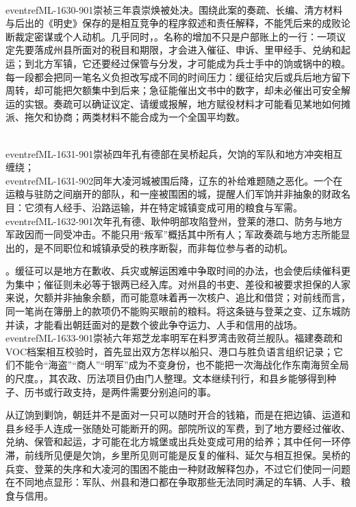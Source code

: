 \\eventref{ML-1630-901}{崇祯三年袁崇焕被处决}。围绕此案的奏疏、长编、清方材料与后出的《明史》保存的是相互竞争的程序叙述和责任解释，不能凭后来的成败论断裁定密谋或个人动机。几乎同时，。名称的增加不只是户部账上的一行：一项议定先要落成州县所面对的税目和期限，才会进入催征、申诉、里甲经手、兑纳和起运；到北方军镇，它还要经过保管与分发，才可能成为兵士手中的饷或锅中的粮。每一段都会把同一笔名义负担改写成不同的时间压力：缓征给灾后或兵后地方留下周转，却可能把欠额集中到后来；急征能催出文书中的数字，却未必催出可安全解运的实银。奏疏可以确证议定、请缓或报解，地方赋役材料才可能看见某地如何摊派、拖欠和协商；两类材料不能合成为一个全国平均数。

\\eventref{ML-1631-901}{崇祯四年孔有德部在吴桥起兵}，欠饷的军队和地方冲突相互缠绕；\\eventref{ML-1631-902}{同年大凌河城被围后降}，辽东的补给难题随之恶化。一个在运粮与驻防之间崩开的部队，和一座被围困的城，提醒人们军饷并非抽象的财政名目：它须有人经手、沿路运输，并在特定城镇变成可用的粮食与军需。\\eventref{ML-1632-901}{次年孔有德、耿仲明部攻陷登州}，登莱的港口、防务与地方军政因而一同受冲击。不能只用“叛军”概括其中所有人；军政奏疏与地方志所能显出的，是不同职位和城镇承受的秩序断裂，而非每位参与者的动机。

。缓征可以是地方在歉收、兵灾或解运困难中争取时间的办法，也会使后续催科更为集中；催征则未必等于银两已经入库。对州县的书吏、差役和被要求担保的人家来说，欠额并非抽象余额，而可能意味着再一次核户、追比和借贷；对前线而言，同一笔尚在簿册上的款项仍不能购买眼前的粮料。将这条链与登莱之变、辽东城防并读，才能看出朝廷面对的是数个彼此争夺运力、人手和信用的战场。\\eventref{ML-1633-901}{崇祯六年郑芝龙率明军在料罗湾击败荷兰舰队}。福建奏疏和VOC档案相互校验时，首先显出双方怎样以船只、港口与胜负语言组织记录；它们不能令“海盗”“商人”“明军”成为不变身份，也不能把一次海战化作东南海贸全局的尺度。，其农政、历法项目仍由门人整理。文本继续刊行，和县乡能够得到种子、历书或行政支持，是两件需要分别追问的事。

从辽饷到剿饷，朝廷并不是面对一只可以随时开合的钱箱，而是在把边镇、运道和县乡经手人连成一张随处可能断开的网。部院所议的军费，到了地方要经过催收、兑纳、保管和起运，才可能在北方城堡或出兵处变成可用的给养；其中任何一环停滞，前线所见便是欠饷，乡里所见则可能是反复的催科、延欠与相互担保。吴桥的兵变、登莱的失序和大凌河的围困不能由一种财政解释包办，不过它们使同一问题在不同地点显形：军队、州县和港口都在争取那些无法同时满足的车辆、人手、粮食与信用。

